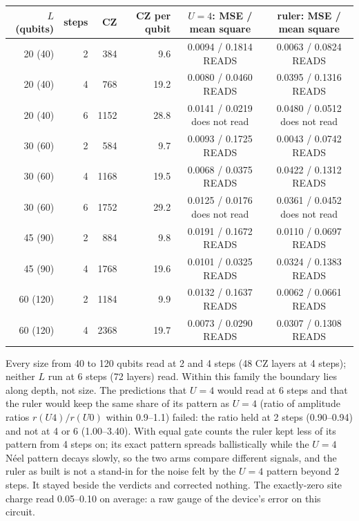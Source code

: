 \begin{center}\small
\begin{tabular}{rrrrcc}
\hline
$L$ (qubits) & steps & CZ & CZ per qubit & $U=4$: MSE / mean square & ruler: MSE / mean square \\
\hline
20 (40) & 2 & 384 & 9.6 & 0.0094 / 0.1814 READS & 0.0063 / 0.0824 READS \\
20 (40) & 4 & 768 & 19.2 & 0.0080 / 0.0460 READS & 0.0395 / 0.1316 READS \\
20 (40) & 6 & 1152 & 28.8 & 0.0141 / 0.0219 does not read & 0.0480 / 0.0512 does not read \\
30 (60) & 2 & 584 & 9.7 & 0.0093 / 0.1725 READS & 0.0043 / 0.0742 READS \\
30 (60) & 4 & 1168 & 19.5 & 0.0068 / 0.0375 READS & 0.0422 / 0.1312 READS \\
30 (60) & 6 & 1752 & 29.2 & 0.0125 / 0.0176 does not read & 0.0361 / 0.0452 does not read \\
45 (90) & 2 & 884 & 9.8 & 0.0191 / 0.1672 READS & 0.0110 / 0.0697 READS \\
45 (90) & 4 & 1768 & 19.6 & 0.0101 / 0.0325 READS & 0.0324 / 0.1383 READS \\
60 (120) & 2 & 1184 & 9.9 & 0.0132 / 0.1637 READS & 0.0062 / 0.0661 READS \\
60 (120) & 4 & 2368 & 19.7 & 0.0073 / 0.0290 READS & 0.0307 / 0.1308 READS \\
\hline
\end{tabular}
\end{center}

Every size from 40 to 120 qubits read at 2 and 4 steps (48 CZ layers at 4 steps); neither $L$ run at 6 steps (72
layers) read. Within this family the boundary lies along depth, not size. The predictions that $U = 4$ would read at 6
steps and that the ruler would keep the same share of its pattern as $U = 4$ (ratio of amplitude ratios
$r(U4)/r(U0)$ within 0.9--1.1) failed: the ratio held at 2 steps (0.90--0.94) and not at 4 or 6 (1.00--3.40). With
equal gate counts the ruler kept less of its pattern from 4 steps on; its exact pattern spreads ballistically while
the $U = 4$ N\'eel pattern decays slowly, so the two arms compare different signals, and the ruler as built is not a
stand-in for the noise felt by the $U = 4$ pattern beyond 2 steps. It stayed beside the verdicts and corrected
nothing. The exactly-zero site charge read 0.05--0.10 on average: a raw gauge of the device's error on this circuit.

